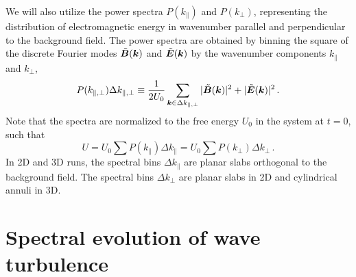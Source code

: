 We will also utilize the power spectra $P(k_\parallel)$ and $P(k_\perp)$, representing the distribution of electromagnetic energy in wavenumber parallel and perpendicular to the background field. The power spectra are obtained by binning the square of the discrete Fourier modes $\tilde{\boldsymbol{B}}(\boldsymbol{k})$ and $\tilde{\boldsymbol{E}}(\boldsymbol{k})$ by the wavenumber components $k_\parallel$ and $k_\perp$,
%
\begin{equation} \label{eqn:power-spectrum}
	P(k_{\parallel,\perp}) \Delta k_{\parallel,\perp}\equiv \frac{1}{2 U_0} \sum\limits_{\boldsymbol k \in \Delta k_{\parallel, \perp}} |\tilde{\boldsymbol{B}}(\boldsymbol{k})|^2 + |\tilde{\boldsymbol{E}}(\boldsymbol{k})|^2 \, .
\end{equation}
%
Note that the spectra are normalized to the free energy $U_0$ in the system at $t=0$, such that
%
\begin{equation}
	U = U_0 \sum 
	P(k_\parallel)\Delta k_\parallel =
    U_0 \sum 
      P(k_\perp) \Delta k_\perp \, .
\end{equation}
In 2D and 3D runs, the spectral bins $\Delta k_\parallel$ are planar slabs orthogonal to the background field. The spectral bins $\Delta k_\perp$ are planar slabs in 2D and cylindrical annuli in 3D.
%

\section{Spectral evolution of wave turbulence}\label{sec:spec}
